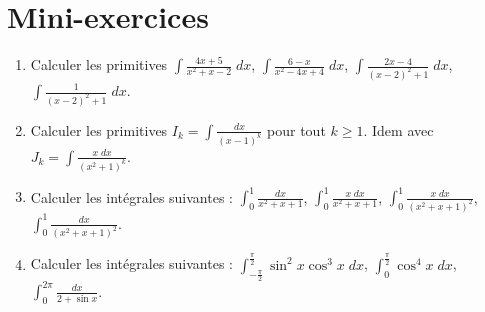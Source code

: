 \section*{Mini-exercices}


\begin{frame}
\begin{miniexercice}
\begin{enumerate}
  \item Calculer les primitives $\int \frac{4x+5}{x^2+x-2}\; dx$,
$\int \frac{6-x}{x^2-4x+4}\; dx$, $\int \frac{2x-4}{(x-2)^2+1}\; dx$, $\int \frac{1}{(x-2)^2+1}\; dx$.

  \item Calculer les primitives $I_k = \int \frac{dx}{(x-1)^k}$ pour tout $k \ge 1$.
Idem avec $J_k = \int \frac{x\; dx}{(x^2+1)^k}$.

  \item Calculer les intégrales suivantes :
$\int_0^1 \frac{dx}{x^2+x+1}$, $\int_0^1 \frac{x \; dx}{x^2+x+1}$, $\int_0^1\frac{x\; dx}{(x^2+x+1)^2}$,  
$\int_0^1\frac{dx}{(x^2+x+1)^2}$.

  \item Calculer les intégrales suivantes :
$\int_{-\frac\pi2}^{\frac\pi2} \sin^2 x \cos^3 x \; dx$,
$\int_{0}^{\frac\pi2} \cos^4 x \; dx$,
$\int_0^{2\pi} \frac{dx}{2+\sin x}$.
\end{enumerate}
\end{miniexercice}
\end{frame}


